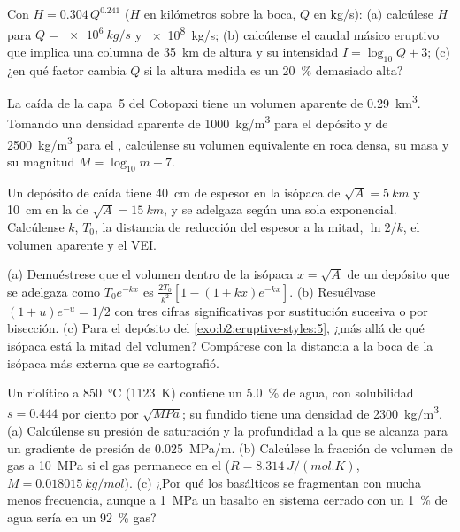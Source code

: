 \begin{exercise}[$\star$]\label{exo:b2:eruptive-styles:3}
Con $H = 0.304\,Q^{0.241}$ ($H$ en kilómetros sobre la boca, $Q$ en
\unit{kg/s}): (a) calcúlese $H$ para $Q = \qty{e6}{kg/s}$ y \qty{e8}{kg/s};
(b) calcúlense el caudal másico eruptivo que implica una columna de \qty{35}{km} de altura y su
intensidad $I = \log_{10}Q + 3$; (c) ¿en qué factor cambia $Q$ si la altura medida
es un \qty{20}{\percent} demasiado alta?
\end{exercise}

\begin{exercise}[$\star$]\label{exo:b2:eruptive-styles:4}
La caída de la capa~5 del Cotopaxi tiene un volumen aparente de \qty{0.29}{km^3}. Tomando una
densidad aparente de \qty{1000}{kg/m^3} para el depósito y de \qty{2500}{kg/m^3} para el
, calcúlense su volumen equivalente en roca densa, su masa y su magnitud
$M = \log_{10}m - 7$.
\end{exercise}

\begin{exercise}[$\star\star$]\label{exo:b2:eruptive-styles:5}
Un depósito de caída tiene \qty{40}{cm} de espesor en la isópaca de $\sqrt A = \qty{5}{km}$
y \qty{10}{cm} en la de $\sqrt A = \qty{15}{km}$, y se adelgaza según una sola
exponencial. Calcúlense $k$, $T_0$, la distancia de reducción del espesor a la mitad, $\ln 2/k$, el volumen
aparente y el VEI.
\end{exercise}

\begin{exercise}[$\star\star$]\label{exo:b2:eruptive-styles:6}
(a) Demuéstrese que el volumen dentro de la isópaca $x = \sqrt A$ de un depósito que se adelgaza
como $T_0e^{-kx}$ es $\frac{2T_0}{k^2}[1 - (1 + kx)e^{-kx}]$. (b) Resuélvase $(1 + u)e^{-u} =
1/2$ con tres cifras significativas por sustitución sucesiva o por bisección. (c) Para
el depósito del \cref{exo:b2:eruptive-styles:5}, ¿más allá de qué isópaca está la mitad del volumen? Compárese
con la distancia a la boca de la isópaca más externa que se cartografió.
\end{exercise}

\begin{exercise}[$\star\star$]\label{exo:b2:eruptive-styles:7}
Un  riolítico a \qty{850}{\celsius} (\qty{1123}{K}) contiene un
\qty{5.0}{\percent} de agua, con solubilidad $s = 0.444$ por ciento por
$\sqrt{\unit{MPa}}$; su fundido tiene una densidad de \qty{2300}{kg/m^3}. (a) Calcúlense su
presión de saturación y la profundidad a la que se alcanza para un gradiente de presión
de \qty{0.025}{MPa/m}. (b) Calcúlese la fracción de volumen de gas a
\qty{10}{MPa} si el gas permanece en el  ($R = \qty{8.314}{J/(mol.K)}$, $M =
\qty{0.018015}{kg/mol}$). (c) ¿Por qué los  basálticos se fragmentan con mucha menos
frecuencia, aunque a \qty{1}{MPa} un basalto en sistema cerrado con un \qty{1}{\percent} de
agua sería en un \qty{92}{\percent} gas?
\end{exercise}

